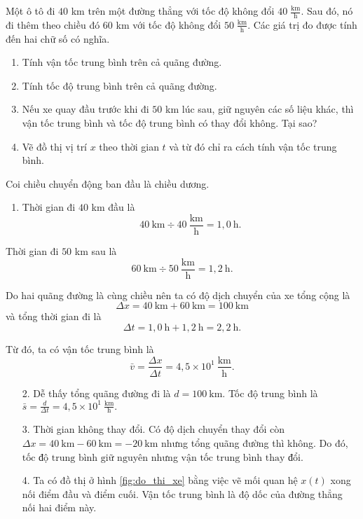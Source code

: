 \documentclass[a4paper, titlepage, openany]{book}
\newcounter{exercise}
\newcounter{solution}
\begin{document}
\exercise Một ô tô đi $40$ km trên một đường thẳng với tốc độ không đổi $40\;\frac{\text{km}}{\text{h}}$. Sau đó, nó đi thêm theo chiều đó $60$ km với tốc độ không đổi $50\;\frac{\text{km}}{\text{h}}$. Các giá trị đo được tính đến hai chữ số có nghĩa.
\begin{enumerate}
   \item Tính vận tốc trung bình trên cả quãng đường.
   \item Tính tốc độ trung bình trên cả quãng đường.
   \item Nếu xe quay đầu trước khi đi $50$ km lúc sau, giữ nguyên các số liệu khác, thì vận tốc trung bình và tốc độ trung bình có thay đổi không. Tại sao?
   \item Vẽ đồ thị vị trí $x$ theo thời gian $t$ và từ đó chỉ ra cách tính vận tốc trung bình.
\end{enumerate}
\solution

Coi chiều chuyển động ban đầu là chiều dương.

\begin{enumerate}
   \item Thời gian đi $40$ km đầu là $$40\ \text{km}\div 40\ \frac{\text{km}}{\text{h}}=1{,}0\ \text{h}.$$
\end{enumerate}

Thời gian đi $50$ km sau là $$60\ \text{km}\div 50\ \frac{\text{km}}{\text{h}}=1{,}2\ \text{h}.$$

Do hai quãng đường là cùng chiều nên ta có độ dịch chuyển của xe tổng cộng là $$\Delta x=40\ \text{km} + 60\ \text{km} = 100\ \text{km}$$ và tổng thời gian đi là $$\Delta t =1{,}0\ \text{h}+1{,}2\ \text{h}=2{,}2\ \text{h}.$$

Từ đó, ta có vận tốc trung bình là $$\bar{v} = \frac{\Delta x}{\Delta t} =\boxed{4{,}5\times10^1\ \frac{\text{km}}{\text{h}}}.$$

\begin{enumerate}
   \item[2.] Dễ thấy tổng quãng đường đi là $d=100\ \text{km}$. Tốc độ trung bình là $\bar{s} = \frac{d}{\Delta t}=\boxed{4{,}5\times10^1\ \frac{\text{km}}{\text{h}}}.$
   \item[3.] Thời gian không thay đổi. Có độ dịch chuyển thay đổi còn $\Delta x = 40\ \text{km} - 60\ \text{km} = -20\ \text{km}$ nhưng tổng quãng đường thì không. Do đó, $\boxed{\text{tốc độ trung bình giữ nguyên}}$ nhưng $\boxed{\text{vận tốc trung bình thay đổi}}$.
   \item[4.] Ta có đồ thị ở hình \ref{fig:do_thi_xe} bằng việc vẽ mối quan hệ $x(t)$ xong nối điểm đầu và điểm cuối. Vận tốc trung bình là độ dốc của đường thẳng nối hai điểm này.
\end{enumerate}
\end{document}
